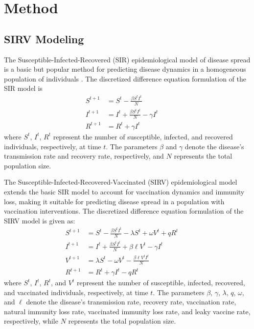 \documentclass{article}
\begin{document}
\section{Method}
\subsection{SIRV Modeling}
The Susceptible-Infected-Recovered (SIR) epidemiological model of disease spread is a basic but popular method for predicting disease dynamics in a homogeneous population of individuals \parencite{longini1986generalized}. The discretized difference equation formulation of the SIR model is 
\begin{align}
    S^{t+1} &= S^t - \frac{\beta S^t I^t}{N} && \label{eq:s_basic} \\
    I^{t+1} &= I^t + \frac{\beta S^t I^t}{N} - \gamma I^t && \label{eq:i_basic} \\
    R^{t+1} &= R^t + \gamma I^t && \label{eq:r_basic}
\end{align}
where $S^t$, $I^t$, $R^t$ represent the number of susceptible, infected, and recovered individuals, respectively, at time $t$. The parameters $\beta$ and $\gamma$ denote the disease's transmission rate and recovery rate, respectively, and $N$ represents the total population size. 

The Susceptible-Infected-Recovered-Vaccinated (SIRV) epidemiological model extends the basic SIR model to account for vaccination dynamics and immunity loss, making it suitable for predicting disease spread in a population with vaccination interventions. The discretized difference equation formulation of the SIRV model is given as:
\begin{align}
    S^{t+1} &= S^t - \frac{\beta S^t I^t}{N} - \lambda S^t + \omega V^t + q R^t && \label{eq:susceptibleV} \\
    I^{t+1} &= I^t + \frac{\beta S^t I^t}{N} + \beta \ell V^t - \gamma I^t && \label{eq:infectedV} \\
    V^{t+1} &= \lambda S^{t} - \omega V^t - \frac{\beta \ell V^t I^t}{N} && \label{eq:vaccinatedV} \\
    R^{t+1} &= R^t + \gamma I^t - q R^t && \label{eq:recoveredV}
\end{align}
where $S^t$, $I^t$, $R^t$, and $V^t$ represent the number of susceptible, infected, recovered, and vaccinated individuals, respectively, at time $t$. The parameters $\beta$, $\gamma$, $\lambda$, $q$, $\omega$, and $\ell$ denote the disease's transmission rate, recovery rate, vaccination rate, natural immunity loss rate, vaccinated immunity loss rate, and leaky vaccine rate, respectively, while $N$ represents the total population size.
\end{document}
